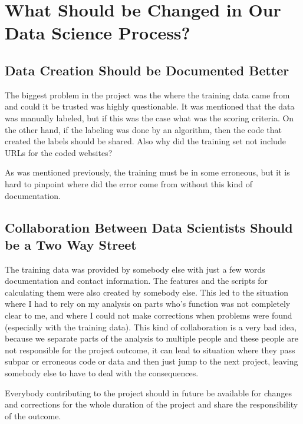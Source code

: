 \documentclass[12pt,a4paper,leqno]{report}
\theoremstyle{plain}
\theoremstyle{definition}
\theoremstyle{remark}
\begin{document}
\section{What Should be Changed in Our Data Science Process?}

\subsection{Data Creation Should be Documented Better}

The biggest problem in the project was the where the training data came
from and could it be trusted was highly questionable. It was mentioned that
the data was manually labeled, but if this was the case what was the
scoring criteria. On the other hand, if the labeling was done by an algorithm,
then the code that created the labels should be shared. Also
why did the training set not include URLs for the coded websites?

As was mentioned previously, the training must be in some erroneous, but
it is hard to pinpoint where did the error come from without this kind
of documentation.

\subsection{Collaboration Between Data Scientists Should be a Two Way Street}

The training data was provided by somebody else with just a few words
documentation and contact information. The features and the scripts for calculating
them were also created by somebody else. This led to the situation
where I had to rely on my analysis on parts who's function was not completely
clear to me, and where I could not make corrections when problems were found
(especially with the training data). This kind of collaboration is a very
bad idea, because we separate parts of the analysis to multiple people and
these people are not responsible for the project outcome, it can lead to
situation where they pass subpar or erroneous code or data and then just
jump to the next project, leaving somebody else to have to deal with the consequences.

Everybody contributing to the project should in future be available for changes
and corrections for the whole duration of the project and share the responsibility
of the outcome.
\end{document}
